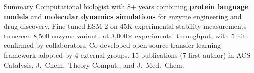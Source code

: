 \documentclass{resume}
\begin{document}
\vspace{-0.15cm}

\begin{rSection}{Summary}
Computational biologist with 8+ years combining \textbf{protein language models} and \textbf{molecular dynamics simulations} for enzyme engineering and drug discovery. Fine-tuned ESM-2 on 45K experimental stability measurements to screen 8,500 enzyme variants at 3,000$\times$ experimental throughput, with 5 hits confirmed by collaborators. Co-developed open-source transfer learning framework adopted by 4 external groups. 15 publications (7 first-author) in ACS Catalysis, J.\ Chem.\ Theory Comput., and J.\ Med.\ Chem.
\end{rSection}
\vspace{-0.15cm}
\end{document}
